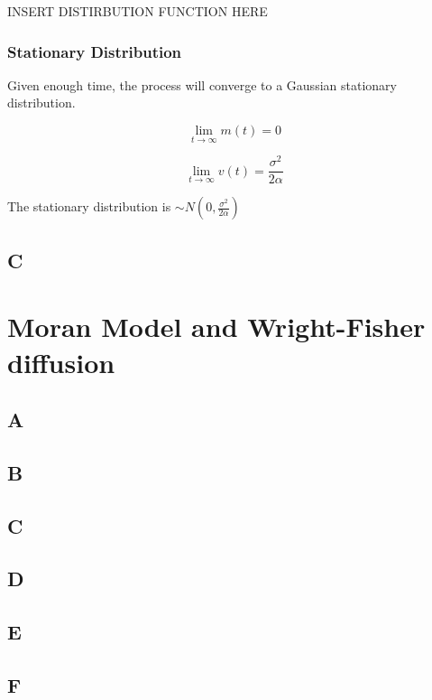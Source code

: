 \documentclass{article}
\begin{document}
INSERT DISTIRBUTION FUNCTION HERE

\subsubsection{Stationary Distribution}

Given enough time, the process will converge to a Gaussian stationary distribution.  

$$\lim_{t \to \infty} m(t) = 0$$

$$\lim_{t \to \infty} v(t) = \frac{\sigma^2}{2 \alpha}$$

The stationary distribution is $\sim N(0,\frac{\sigma^2}{2 \alpha})$ 



\subsection{C}

\section{Moran Model and Wright-Fisher diffusion}

\subsection{A}

\subsection{B}

\subsection{C}

\subsection{D}

\subsection{E}

\subsection{F}
\end{document}
